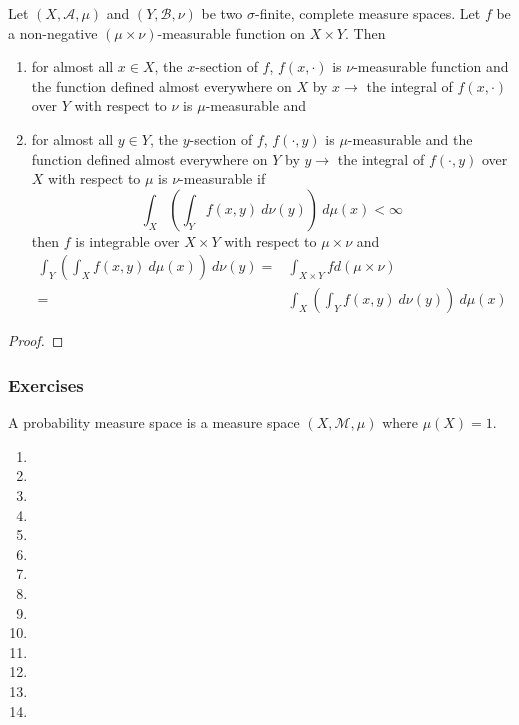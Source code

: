 \begin{corollary}
	Let $(X,\mathcal{A},\mu)$ and $(Y,\mathcal{B},\nu)$ be two $\sigma$-finite, complete measure spaces.
	Let $f$ be a non-negative $(\mu \times \nu)$-measurable function on $X \times Y$.
	Then
	\begin{enumerate}
		\item for almost all $x \in X$, the $x$-section of $f$, $f(x,\cdot)$ is $\nu$-measurable function and the function defined almost everywhere on $X$ by $x \to $ the integral of $f(x,\cdot)$ over $Y$ with respect to $\nu$ is $\mu$-measurable and
		\item for almost all $y \in Y$, the $y$-section of $f$, $f(\cdot,y)$ is $\mu$-measurable and the function defined almost everywhere on $Y$ by $y \to $ the integral of $f(\cdot,y)$ over $X$ with respect to $\mu$ is $\nu$-measurable if
		\begin{equation}
			\int_X \left( \int_Y f(x,y) \ d\nu(y) \right) \ d\mu(x) < \infty
		\end{equation}
		then $f$ is integrable over $X \times Y$ with respect to $\mu \times \nu$ and
		\begin{align}
			\int_Y \left( \int_X f(x,y) \ d\mu(x) \right) \ d\nu(y) = & \int_{X \times Y} f d(\mu \times \nu) \\
			= & \int_X \left( \int_Y f(x,y) \ d\nu(y) \right) \ d\mu(x) \nonumber
		\end{align}
	\end{enumerate}
\end{corollary}
\begin{proof}
\end{proof}

\subsubsection{Exercises}
\begin{definition}
	A probability measure space is a measure space $(X,\mathcal{M},\mu)$ where $\mu(X) = 1$.
\end{definition}
\begin{enumerate}
	\item
	\item
	\item
	\item
	\item
	\item
	\item
	\item
	\item
	\item
	\item
	\item
	\item
	\item 
\end{enumerate}



